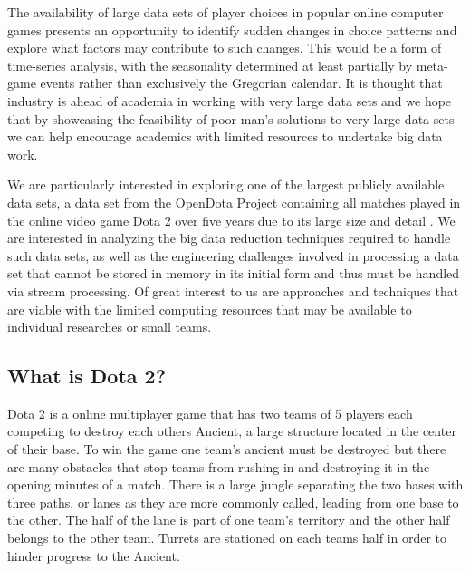 The availability of large data sets of player choices in popular online computer games presents an opportunity to identify sudden changes in choice patterns and explore what factors may contribute to such changes. This would be a form of time-series analysis, with the seasonality determined at least partially by meta-game events rather than exclusively the Gregorian calendar. It is thought that industry is ahead of academia in working with very large data sets \cite{jinSignificanceChallengesBig2015} and we hope that by showcasing the feasibility of poor man's solutions to very large data sets we can help encourage academics with limited resources to undertake big data work.

We are particularly interested in exploring one of the largest publicly available data sets, a data set from the OpenDota Project \cite{theopendotaprojectFAQ2014} containing all matches played in the online video game Dota 2 over five years due to its large size and detail \cite{theopendotaprojectDataDumpMarch2017}. We are interested in analyzing the big data reduction techniques required to handle such data sets, as well as the engineering challenges involved in processing a data set that cannot be stored in memory in its initial form and thus must be handled via stream processing. Of great interest to us are approaches and techniques that are viable with the limited computing resources that may be available to individual researches or small teams.

\subsection{What is Dota 2?} %

Dota 2 is a online multiplayer game that has two teams of 5 players each competing to destroy each others Ancient, a large structure located in the center of their base. To win the game one team's ancient must be destroyed but there are many obstacles that stop teams from rushing in and destroying it in the opening minutes of a match. There is a large jungle separating the two bases with three paths, or lanes as they are more commonly called, leading from one base to the other. The half of the lane is part of one team's territory and the other half belongs to the other team. Turrets are stationed on each teams half in order to hinder progress to the Ancient.

